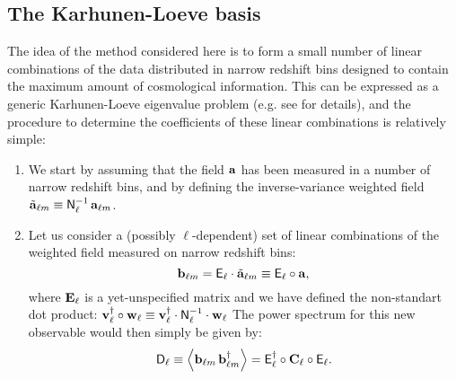 \documentclass[a4paper,10pt]{article}
\begin{document}
  \subsection{The Karhunen-Loeve basis}
    The idea of the method considered here is to form a small number of linear combinations of the data distributed in narrow redshift bins designed to contain the maximum amount of cosmological information. This can be expressed as a generic Karhunen-Loeve eigenvalue problem (e.g. see \cite{1997ApJ...480...22T} for details), and the procedure to determine the coefficients of these linear combinations is relatively simple:
    \begin{enumerate}
      \item We start by assuming that the field ${\bf a}$ has been measured in a number of narrow redshift bins, and by defining the inverse-variance weighted field $\tilde{\bf a}_{\ell m}\equiv{\sf N}^{-1}_\ell\,{\bf a}_{\ell m}$.
      \item Let us consider a (possibly $\ell$-dependent) set of linear combinations of the weighted field measured on narrow redshift bins:
      \begin{equation}
        {\bf b}_{\ell m}={\sf E}_\ell\cdot\tilde{\bf a}_{\ell m}\equiv{\sf E}_\ell\circ{\bf a},
      \end{equation}
      where ${\bf E}_\ell$ is a yet-unspecified matrix and we have defined the non-standart dot product: ${\bf v}^\dag_\ell\circ{\bf w}_\ell\equiv{\bf v}^\dag_\ell\cdot{\sf N}^{-1}_\ell\cdot{\bf w}_\ell$
      The power spectrum for this new observable would then simply be given by:
      \begin{equation}
        {\sf D}_\ell\equiv\left\langle{\bf b}_{\ell m}\,{\bf b}^\dag_{\ell m}\right\rangle={\sf E}_\ell^\dag\circ{\bf C}_\ell\circ{\sf E}_\ell.
      \end{equation}
      

\end{enumerate}
\end{document}
